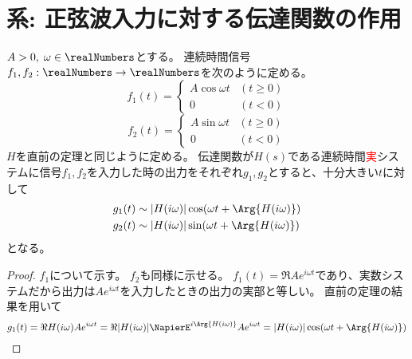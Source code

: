 		\section{系: 正弦波入力に対する伝達関数の作用}
			\begin{shadebox}
				$A>0,\;\omega \in \realNumbers$とする。
				連続時間信号$f_1,f_2: \realNumbers \to \realNumbers$を次のように定める。
				\[
					f_1(t) =
					\begin{cases}
						A\cos\omega t & (t\geq 0) \\
						0 & (t<0)
					\end{cases}
				\]
				\[
					f_2(t) =
					\begin{cases}
						A\sin\omega t & (t\geq 0) \\
						0 & (t<0)
					\end{cases}
				\]
				$H$を直前の定理と同じように定める。
				伝達関数が$H(s)$である連続時間\textcolor{red}{実}システムに信号$f_1,f_2$を入力した時の出力をそれぞれ$g_1,g_2$とすると、十分大きい$t$に対して
				\begin{align*}
					g_1(t) &\sim |H(i\omega)|\cos(\omega t + \Arg{H(i\omega)}) \\
					g_2(t) &\sim |H(i\omega)|\sin(\omega t + \Arg{H(i\omega)})
				\end{align*}
				となる。
			\end{shadebox}
			\begin{proof}
				\quad\par
				$f_1$について示す。
				$f_2$も同様に示せる。
				$f_1(t) = \Re{Ae^{i\omega t}}$であり、実数システムだから出力は$Ae^{i\omega t}$を入力したときの出力の実部と等しい。
				直前の定理の結果を用いて
				\[ g_1(t) = \Re{H(i\omega)Ae^{i\omega t}} = \Re{|H(i\omega)|\NapierE^{i\Arg{H(i\omega)}}Ae^{i\omega t}} = |H(i\omega)|\cos (\omega t + \Arg{H(i\omega)}) \]
			\end{proof}
